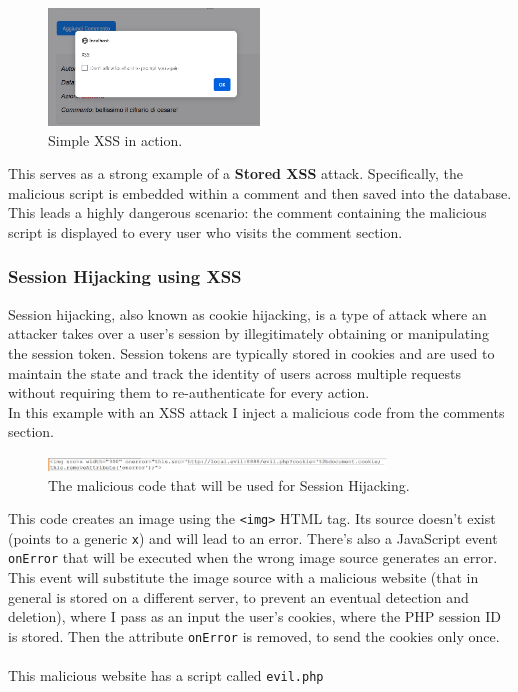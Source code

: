 \documentclass{article}
\begin{document}
\begin{figure}[h]
\centering
\includegraphics[width=0.5\textwidth]{images/6.png}
\caption{Simple XSS in action.}
\label{fig:xss2}
\end{figure}

This serves as a strong example of a \textbf{Stored XSS} attack. Specifically, the malicious script is embedded within a comment and then saved into the database. This leads a highly dangerous scenario: the comment containing the malicious script is displayed to every user who visits the comment section.

\subsubsection{Session Hijacking using XSS}
Session hijacking, also known as cookie hijacking, is a type of attack where an attacker takes over a user's session by illegitimately obtaining or manipulating the session token. Session tokens are typically stored in cookies and are used to maintain the state and track the identity of users across multiple requests without requiring them to re-authenticate for every action.
\\
In this example with an XSS attack I inject a malicious code from the comments section.

\begin{figure}[h]
\centering
\includegraphics[width=0.8\textwidth]{images/13.png}
\caption{The malicious code that will be used for Session Hijacking.}
\label{fig:sesshi}
\end{figure}

This code creates an image using the \texttt{<img>} HTML tag. Its source doesn't exist (points to a generic \texttt{x}) and will lead to an error. There's also a JavaScript event \texttt{onError} that will be executed when the wrong image source generates an error. This event will substitute the image source with a malicious website (that in general is stored on a different server, to prevent an eventual detection and deletion), where I pass as an input the user's cookies, where the PHP session ID is stored. Then the attribute \texttt{onError} is removed, to send the cookies only once.
\\
\\
This malicious website has a script called \texttt{evil.php}
\end{document}
